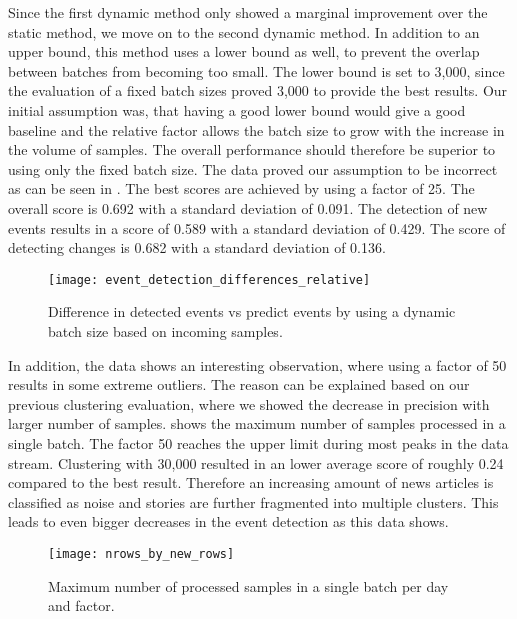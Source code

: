 Since the first dynamic method only showed a marginal improvement over the static method,
we move on to the second dynamic method.
In addition to an upper bound, this method uses a lower bound as well,
to prevent the overlap between batches from becoming too small.
The lower bound is set to 3,000, since the evaluation of a fixed batch sizes proved 3,000 to provide the best results.
Our initial assumption was, that having a good lower bound
would give a good baseline and the relative factor allows the batch size
to grow with the increase in the volume of samples.
The overall performance should therefore be superior to using only the fixed batch size.
The data proved our assumption to be incorrect as can be seen in .
The best scores are achieved by using a factor of 25.
The overall score is 0.692 with a standard deviation of 0.091.
The detection of new events results in a score of 0.589 with a standard deviation of 0.429.
The score of detecting changes is 0.682 with a standard deviation of 0.136.

\begin{figure}[h]
   \centering
   \texttt{[image: event\_detection\_differences\_relative]}
   \caption{Difference in detected events vs predict events by using a dynamic batch size based on incoming samples.}
   \label{fig:event_detection_differences_relative}
\end{figure}

In addition, the data shows an interesting observation, where using a factor of 50 results in some extreme outliers.
The reason can be explained based on our previous clustering evaluation,
where we showed the decrease in precision with larger number of samples.
 shows the maximum number of samples processed in a single batch.
The factor 50 reaches the upper limit during most peaks in the data stream.
Clustering with 30,000 resulted in an lower average score of roughly 0.24 compared to the best result.
Therefore an increasing amount of news articles is classified as noise and stories
are further fragmented into multiple clusters.
This leads to even bigger decreases in the event detection as this data shows.

\begin{figure}[h]
    \centering
    \texttt{[image: nrows\_by\_new\_rows]}
    \caption{Maximum number of processed samples in a single batch per day and factor.}
    \label{fig:nrows_by_new_rows}
 \end{figure}

